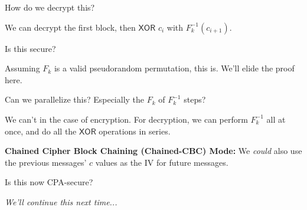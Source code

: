 
\begin{ques*}
    How do we decrypt this?
\end{ques*}
We can decrypt the first block, then $\mathsf{XOR}$ $c_i$ with $F^{-1}_k(c_{i+1})$.

\begin{ques*}
    Is this secure?
\end{ques*}
Assuming $F_k$ is a valid pseudorandom permutation, this is. We'll elide the proof here.

\begin{ques*}
    Can we parallelize this? Especially the $F_k$ of $F_k^{-1}$ steps?
\end{ques*}
We can't in the case of encryption. For decryption, we can perform $F_k^{-1}$ all at once, and do all the $\mathsf{XOR}$ operations in series.

\textbf{Chained Cipher Block Chaining (Chained-CBC) Mode:}
We \emph{could} also use the previous messages' $c$ values as the IV for future messages.


\begin{ques*}
    Is this now CPA-secure?
\end{ques*}
\emph{We'll continue this next time...}